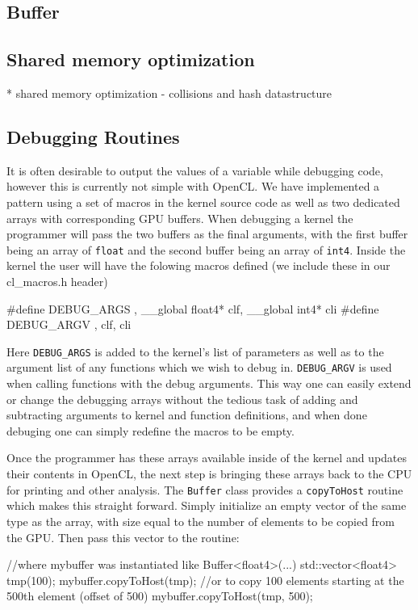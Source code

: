 \subsection{Buffer}


\subsection{Shared memory optimization}
* shared memory optimization - collisions and hash datastructure 


\subsection{Debugging Routines}

It is often desirable to output the values of a variable while debugging code,
however this is currently not simple with OpenCL. We have implemented a pattern
using a set of macros in the kernel source code as well as two dedicated arrays
with corresponding GPU buffers. When debugging a kernel the programmer will
pass the two buffers as the final arguments, with the first buffer being an
array of \verb|float| and the second buffer being an array of \verb|int4|. 
Inside the kernel the user will have the folowing macros defined (we include
these in our cl\_macros.h header)
\begin{cppcode}{0}
#define DEBUG_ARGS  , __global float4* clf, __global int4* cli
#define DEBUG_ARGV  , clf, cli
\end{cppcode}

Here \verb|DEBUG_ARGS| is added to the kernel's list of parameters as well as
to the argument list of any functions which we wish to debug in.
\verb|DEBUG_ARGV| is used when calling functions with the debug arguments. This
way one can easily extend or change the debugging arrays without the tedious
task of adding and subtracting arguments to kernel and function definitions,
and when done debuging one can simply redefine the macros to be empty.

Once the programmer has these arrays available inside of the kernel and updates
their contents in OpenCL, the next step is bringing these arrays back to the
CPU for printing and other analysis. The \verb|Buffer| class provides a
\verb|copyToHost| routine which makes this straight forward. Simply initialize
an empty vector of the same type as the array, with size equal to the
number of elements to be copied from the GPU. Then pass this vector to the routine:
\begin{cppcode}{0}
//where mybuffer was instantiated like Buffer<float4>(...)
std::vector<float4> tmp(100);
mybuffer.copyToHost(tmp);
//or to copy 100 elements starting at the 500th element (offset of 500)
mybuffer.copyToHost(tmp, 500);
\end{cppcode}

